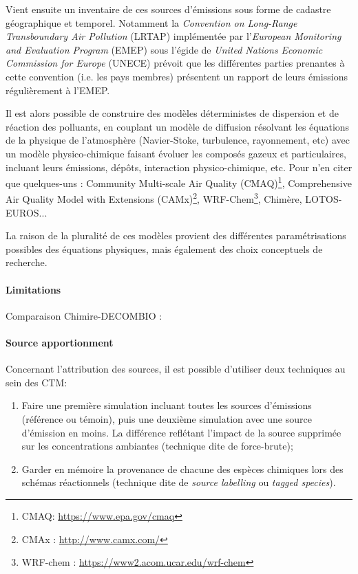 Vient ensuite un inventaire de ces sources d'émissions sous forme de cadastre géographique
et temporel. Notamment la \textit{Convention on Long-Range Transboundary Air
Pollution} (LRTAP) implémentée par l'\textit{European Monitoring and Evaluation Program}
(EMEP) sous l'égide de \textit{United Nations Economic Commission for Europe} (UNECE)
prévoit que les différentes parties prenantes à cette convention (i.e. les pays membres)
présentent un rapport de leurs émissions régulièrement à l'EMEP.

Il est alors possible de construire des modèles déterministes de dispersion et de
réaction des polluants, en couplant un modèle de diffusion résolvant les équations de la
physique de l'atmosphère (Navier-Stoke, turbulence, rayonnement, etc) avec un modèle
physico-chimique faisant évoluer les composés gazeux et particulaires, incluant leurs
émissions, dépôts, interaction physico-chimique, etc. Pour n'en citer que quelques-uns : 
Community Multi-scale Air Quality (CMAQ)\footnote{CMAQ: \url{https://www.epa.gov/cmaq}},
Comprehensive Air Quality Model with Extensions (CAMx)\footnote{CMAx : \url{http://www.camx.com/}},
WRF-Chem\footnote{WRF-chem : \url{https://www2.acom.ucar.edu/wrf-chem}},
Chimère,
LOTOS-EUROS...

La raison de la pluralité de ces modèles provient des différentes paramétrisations
possibles des équations physiques, mais également des choix conceptuels de recherche.

\paragraph{Limitations}%
\label{par:limitations}

Comparaison Chimire-DECOMBIO : \cite{bessagnetHigh2020}

\paragraph{Source apportionment}%
\label{par:source_apportionment}

Concernant l'attribution des sources, il est possible d'utiliser deux techniques au sein
des CTM:

\begin{enumerate}
    \item Faire une première simulation incluant toutes les sources d'émissions (référence
        ou témoin), puis une deuxième simulation avec une source d'émission en moins. La
        différence reflétant l'impact de la source supprimée sur les concentrations
        ambiantes (technique dite de force-brute);
    \item Garder en mémoire la provenance de chacune des espèces chimiques lors des
        schémas réactionnels (technique dite de \textit{source labelling} ou \textit{tagged species}).
\end{enumerate}

